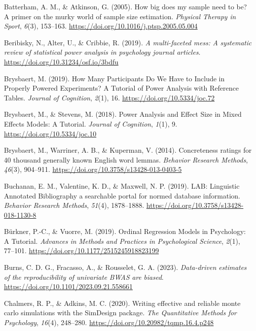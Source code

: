 \documentclass[
  man]{apa7}
\newlength{\cslhangindent}
\newenvironment{CSLReferences}[2] %
 {\begin{list}{}{%
  \setlength{\itemindent}{0pt}
  \setlength{\leftmargin}{0pt}
  \setlength{\parsep}{0pt}
  \ifodd #1
   \setlength{\leftmargin}{\cslhangindent}
   \setlength{\itemindent}{-1\cslhangindent}
  \fi
  \setlength{\itemsep}{#2\baselineskip}}}
 {\end{list}}
\begin{document}
\begin{CSLReferences}{1}{0}
Batterham, A. M., \& Atkinson, G. (2005). How big does my sample need to be? A primer on the murky world of sample size estimation. \emph{Physical Therapy in Sport}, \emph{6}(3), 153--163. \url{https://doi.org/10.1016/j.ptsp.2005.05.004}

Beribisky, N., Alter, U., \& Cribbie, R. (2019). \emph{A multi-faceted mess: A systematic review of statistical power analysis in psychology journal articles}. \url{https://doi.org/10.31234/osf.io/3bdfu}

Brysbaert, M. (2019). How Many Participants Do We Have to Include in Properly Powered Experiments? A Tutorial of Power Analysis with Reference Tables. \emph{Journal of Cognition}, \emph{2}(1), 16. \url{https://doi.org/10.5334/joc.72}

Brysbaert, M., \& Stevens, M. (2018). Power Analysis and Effect Size in Mixed Effects Models: A Tutorial. \emph{Journal of Cognition}, \emph{1}(1), 9. \url{https://doi.org/10.5334/joc.10}

Brysbaert, M., Warriner, A. B., \& Kuperman, V. (2014). Concreteness ratings for 40 thousand generally known English word lemmas. \emph{Behavior Research Methods}, \emph{46}(3), 904--911. \url{https://doi.org/10.3758/s13428-013-0403-5}

Buchanan, E. M., Valentine, K. D., \& Maxwell, N. P. (2019). LAB: Linguistic Annotated Bibliography {\textendash} a searchable portal for normed database information. \emph{Behavior Research Methods}, \emph{51}(4), 1878--1888. \url{https://doi.org/10.3758/s13428-018-1130-8}

Bürkner, P.-C., \& Vuorre, M. (2019). Ordinal Regression Models in Psychology: A Tutorial. \emph{Advances in Methods and Practices in Psychological Science}, \emph{2}(1), 77--101. \url{https://doi.org/10.1177/2515245918823199}

Burns, C. D. G., Fracasso, A., \& Rousselet, G. A. (2023). \emph{Data-driven estimates of the reproducibility of univariate BWAS are biased}. \url{https://doi.org/10.1101/2023.09.21.558661}

Chalmers, R. P., \& Adkins, M. C. (2020). Writing effective and reliable monte carlo simulations with the SimDesign package. \emph{The Quantitative Methods for Psychology}, \emph{16}(4), 248--280. \url{https://doi.org/10.20982/tqmp.16.4.p248}


\end{CSLReferences}
\end{document}
